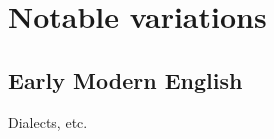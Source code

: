 \documentclass[UTF8, a4paper, oneside, scheme=plain]{ctexrep}
\begin{document}
\chapter{Notable variations}

\section{Early Modern English}

Dialects, etc.





\end{document}
